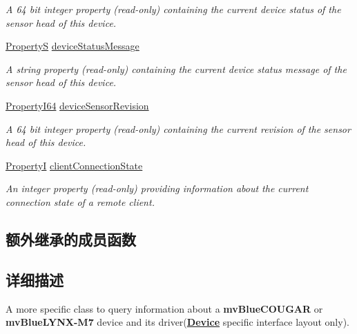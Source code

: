 \begin{DoxyCompactItemize}
\begin{DoxyCompactList}\small\item\em A 64 bit integer property {\bfseries }(read-\/only) containing the current device status of the sensor head of this device. \end{DoxyCompactList}\item 
\hyperlink{classmv_i_m_p_a_c_t_1_1acquire_1_1_property_s}{Property\+S} \hyperlink{classmv_i_m_p_a_c_t_1_1acquire_1_1_info_blue_c_o_u_g_a_r_a740b0124c346b87d8913826bc97d82e6}{device\+Status\+Message}
\begin{DoxyCompactList}\small\item\em A string property {\bfseries }(read-\/only) containing the current device status message of the sensor head of this device. \end{DoxyCompactList}\item 
\hyperlink{group___common_interface_ga81749b2696755513663492664a18a893}{Property\+I64} \hyperlink{classmv_i_m_p_a_c_t_1_1acquire_1_1_info_blue_c_o_u_g_a_r_a62de019282d54684c8ac4da32d625faa}{device\+Sensor\+Revision}
\begin{DoxyCompactList}\small\item\em A 64 bit integer property {\bfseries }(read-\/only) containing the current revision of the sensor head of this device. \end{DoxyCompactList}\item 
\hyperlink{group___common_interface_ga12d5e434238ca242a1ba4c6c3ea45780}{Property\+I} \hyperlink{classmv_i_m_p_a_c_t_1_1acquire_1_1_info_blue_c_o_u_g_a_r_a295b76c275788a9bd5f3c005b7606ff1}{client\+Connection\+State}
\begin{DoxyCompactList}\small\item\em An integer property {\bfseries }(read-\/only) providing information about the current connection state of a remote client. \end{DoxyCompactList}\end{DoxyCompactItemize}
\subsection*{额外继承的成员函数}


\subsection{详细描述}
A more specific class to query information about a {\bfseries mv\+Blue\+C\+O\+U\+G\+A\+R} or {\bfseries mv\+Blue\+L\+Y\+N\+X-\/\+M7} device and its driver({\bfseries \hyperlink{classmv_i_m_p_a_c_t_1_1acquire_1_1_device}{Device}} specific interface layout only). 

